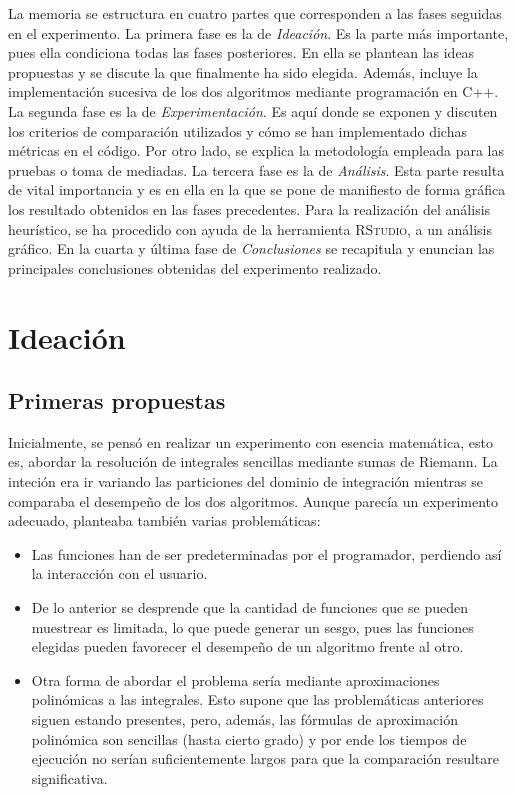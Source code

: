 \documentclass[12pt,a4paper]{article}
\begin{document}
\vspace{0.2cm}

La memoria se estructura en cuatro partes que corresponden a las fases seguidas en el experimento.
La primera fase es la de \textit{Ideación}. Es la parte más importante, pues ella condiciona todas las fases posteriores. En ella se plantean las ideas propuestas y se discute la que finalmente ha sido elegida. Además, incluye la implementación sucesiva de los dos algoritmos mediante programación en C++.
La segunda fase es la de \textit{Experimentación}. Es aquí donde se exponen y discuten los criterios de comparación utilizados y cómo se han implementado dichas métricas en el código. Por otro lado, se explica la metodología empleada para las pruebas o toma de mediadas.
La tercera fase es la de \textit{Análisis}. Esta parte resulta de vital importancia y es en ella en la que se pone de manifiesto de forma gráfica los resultado obtenidos en las fases precedentes. Para la realización del análisis heurístico, se ha procedido con ayuda de la herramienta \textsc{RStudio}, a un análisis gráfico.
En la cuarta y última fase de \textit{Conclusiones} se recapitula y enuncian las principales conclusiones obtenidas del experimento realizado.

\clearpage
\section{Ideación}
\subsection{Primeras propuestas}

Inicialmente, se pensó en realizar un experimento con esencia matemática, esto es, abordar la resolución de integrales sencillas mediante sumas de Riemann. La inteción era ir variando las particiones del dominio de integración mientras se comparaba el desempeño de los dos algoritmos. Aunque parecía un experimento adecuado, planteaba también varias problemáticas: 

\begin{itemize}
	\item Las funciones han de ser predeterminadas por el programador, perdiendo así la interacción con el usuario.
	\item De lo anterior se desprende que la cantidad de funciones que se pueden muestrear es limitada, lo que puede generar un sesgo, pues las funciones elegidas pueden favorecer el desempeño de un algoritmo frente al otro. 
	\item Otra forma de abordar el problema sería mediante aproximaciones polinómicas a las integrales. Esto supone que las problemáticas anteriores siguen estando presentes, pero, además, las fórmulas de aproximación polinómica son sencillas (hasta cierto grado) y por ende los tiempos de ejecución no serían suficientemente largos para que la comparación resultare significativa. 
\end{itemize}
\end{document}
